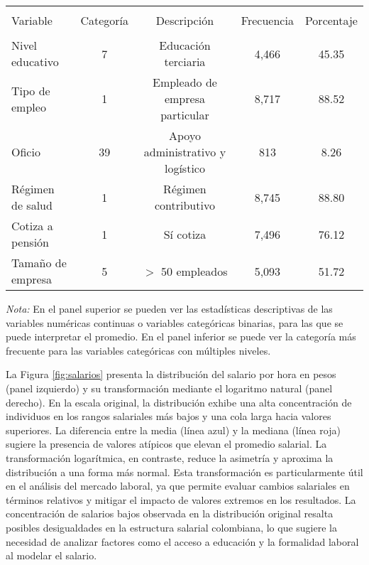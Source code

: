 \documentclass[article,11 pt]{article}
\begin{document}
\begin{table}[!htbp]
{\begin{tabular}{lcccc}
            \hline \\[-1.8ex] 
            Variable & Categoría & Descripción & Frecuencia & Porcentaje \\ 
            \hline \\[-1.8ex] 
            Nivel educativo & 7 & Educación terciaria & 4,466 & 45.35 \\ 
            Tipo de empleo & 1 & Empleado de empresa particular & 8,717 & 88.52 \\ 
            Oficio & 39 & Apoyo administrativo y logístico & 813 & 8.26 \\ 
            Régimen de salud & 1 & Régimen contributivo & 8,745 & 88.80 \\ 
            Cotiza a pensión & 1 & Sí cotiza & 7,496 & 76.12 \\  
            Tamaño de empresa & 5 & $>$ 50 empleados& 5,093 & 51.72 \\ 
            \hline 
        \end{tabular} 
    }
\par{\footnotesize{\textit{Nota:} En el panel superior se pueden ver las estadísticas descriptivas de las variables numéricas continuas o variables categóricas binarias, para las que se puede interpretar el promedio. En el panel inferior se puede ver la categoría más frecuente para las variables categóricas con múltiples niveles.}}
        
\end{table} 
La Figura \ref{fig:salarios} presenta la distribución del salario por hora en pesos (panel izquierdo) y su transformación mediante el logaritmo natural (panel derecho). En la escala original, la distribución exhibe una alta concentración de individuos en los rangos salariales más bajos y una cola larga hacia valores superiores. La diferencia entre la media (línea azul) y la mediana (línea roja) sugiere la presencia de valores atípicos que elevan el promedio salarial. La transformación logarítmica, en contraste, reduce la asimetría y aproxima la distribución a una forma más normal. Esta transformación es particularmente útil en el análisis del mercado laboral, ya que permite evaluar cambios salariales en términos relativos y mitigar el impacto de valores extremos en los resultados. La concentración de salarios bajos observada en la distribución original resalta posibles desigualdades en la estructura salarial colombiana, lo que sugiere la necesidad de analizar factores como el acceso a educación y la formalidad laboral al modelar el salario.
\end{document}

